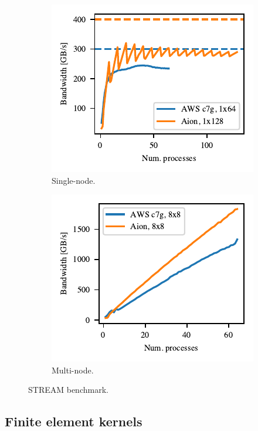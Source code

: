 \begin{figure}
    \begin{subfigure}{.5\textwidth}
        \includegraphics{chapters/chp1/graphics/stream_plots/stream_single_node.pdf}
        \caption{Single-node.}
        \label{fig:stream-single}
    \end{subfigure}%
    \begin{subfigure}{.5\textwidth}
        \includegraphics{chapters/chp1/graphics/stream_plots/stream_multi_node.pdf}
        \caption{Multi-node.}
        \label{fig:stream-multiple}
    \end{subfigure}
    \caption{STREAM benchmark.}
\end{figure}

\subsection*{Finite element kernels}

